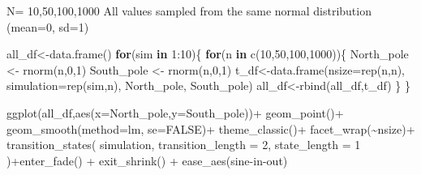 \documentclass[
  letterpaper,
  DIV=11,
  numbers=noendperiod]{scrreprt}
\newenvironment{Shaded}{\begin{snugshade}}{\end{snugshade}}
\newcommand{\AttributeTok}[1]{\textcolor[rgb]{0.40,0.45,0.13}{#1}}
\newcommand{\ConstantTok}[1]{\textcolor[rgb]{0.56,0.35,0.01}{#1}}
\newcommand{\ControlFlowTok}[1]{\textcolor[rgb]{0.00,0.23,0.31}{\textbf{#1}}}
\newcommand{\DecValTok}[1]{\textcolor[rgb]{0.68,0.00,0.00}{#1}}
\newcommand{\FunctionTok}[1]{\textcolor[rgb]{0.28,0.35,0.67}{#1}}
\newcommand{\NormalTok}[1]{\textcolor[rgb]{0.00,0.23,0.31}{#1}}
\newcommand{\OtherTok}[1]{\textcolor[rgb]{0.00,0.23,0.31}{#1}}
\newcommand{\SpecialCharTok}[1]{\textcolor[rgb]{0.37,0.37,0.37}{#1}}
\newcommand{\StringTok}[1]{\textcolor[rgb]{0.13,0.47,0.30}{#1}}
\begin{document}
N= 10,50,100,1000 All values sampled from the same normal distribution
(mean=0, sd=1)

\begin{Shaded}
\begin{Highlighting}[]
\NormalTok{all\_df}\OtherTok{\textless{}{-}}\FunctionTok{data.frame}\NormalTok{()}
\ControlFlowTok{for}\NormalTok{(sim }\ControlFlowTok{in} \DecValTok{1}\SpecialCharTok{:}\DecValTok{10}\NormalTok{)\{}
  \ControlFlowTok{for}\NormalTok{(n }\ControlFlowTok{in} \FunctionTok{c}\NormalTok{(}\DecValTok{10}\NormalTok{,}\DecValTok{50}\NormalTok{,}\DecValTok{100}\NormalTok{,}\DecValTok{1000}\NormalTok{))\{}
\NormalTok{  North\_pole }\OtherTok{\textless{}{-}} \FunctionTok{rnorm}\NormalTok{(n,}\DecValTok{0}\NormalTok{,}\DecValTok{1}\NormalTok{)}
\NormalTok{  South\_pole }\OtherTok{\textless{}{-}} \FunctionTok{rnorm}\NormalTok{(n,}\DecValTok{0}\NormalTok{,}\DecValTok{1}\NormalTok{)}
\NormalTok{  t\_df}\OtherTok{\textless{}{-}}\FunctionTok{data.frame}\NormalTok{(}\AttributeTok{nsize=}\FunctionTok{rep}\NormalTok{(n,n),}
                   \AttributeTok{simulation=}\FunctionTok{rep}\NormalTok{(sim,n),}
\NormalTok{                                  North\_pole,}
\NormalTok{                                  South\_pole)}
\NormalTok{  all\_df}\OtherTok{\textless{}{-}}\FunctionTok{rbind}\NormalTok{(all\_df,t\_df)}
\NormalTok{  \}}
\NormalTok{\}}


\FunctionTok{ggplot}\NormalTok{(all\_df,}\FunctionTok{aes}\NormalTok{(}\AttributeTok{x=}\NormalTok{North\_pole,}\AttributeTok{y=}\NormalTok{South\_pole))}\SpecialCharTok{+}
  \FunctionTok{geom\_point}\NormalTok{()}\SpecialCharTok{+}
  \FunctionTok{geom\_smooth}\NormalTok{(}\AttributeTok{method=}\NormalTok{lm, }\AttributeTok{se=}\ConstantTok{FALSE}\NormalTok{)}\SpecialCharTok{+}
  \FunctionTok{theme\_classic}\NormalTok{()}\SpecialCharTok{+}
  \FunctionTok{facet\_wrap}\NormalTok{(}\SpecialCharTok{\textasciitilde{}}\NormalTok{nsize)}\SpecialCharTok{+}
  \FunctionTok{transition\_states}\NormalTok{(}
\NormalTok{    simulation,}
    \AttributeTok{transition\_length =} \DecValTok{2}\NormalTok{,}
    \AttributeTok{state\_length =} \DecValTok{1}
\NormalTok{  )}\SpecialCharTok{+}\FunctionTok{enter\_fade}\NormalTok{() }\SpecialCharTok{+} 
  \FunctionTok{exit\_shrink}\NormalTok{() }\SpecialCharTok{+}
  \FunctionTok{ease\_aes}\NormalTok{(}\StringTok{\textquotesingle{}sine{-}in{-}out\textquotesingle{}}\NormalTok{)}
\end{Highlighting}
\end{Shaded}
\end{document}
